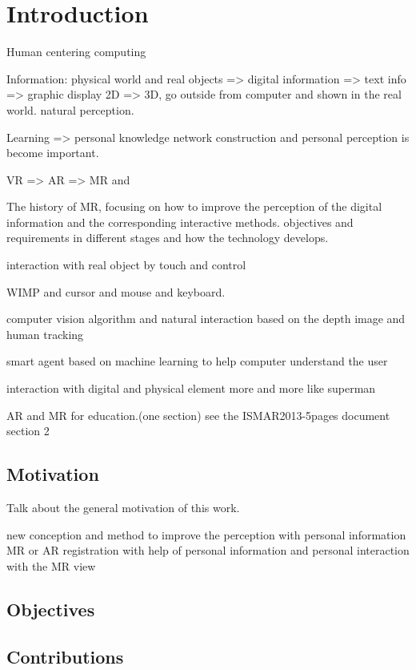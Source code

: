 %

\chapter{Introduction}  %
\label{sec:introduction}

Human centering computing 

Information: physical world and real objects => digital information => text info => graphic display 
2D => 3D, go outside from computer and shown in the real world. natural perception.

Learning => personal knowledge network construction and personal perception is become important.

VR => AR => MR and 

The history of MR, focusing on how to improve the perception of the digital information and the corresponding interactive methods. objectives and requirements in different stages and how the technology develops.

interaction with real object by touch and control 

WIMP and cursor and mouse  and keyboard. 

computer vision algorithm and natural interaction based on the depth image and human tracking

smart agent based on machine learning to help computer understand the user

interaction with digital and physical element more and more like superman 

AR and MR for education.(one section)
see the ISMAR2013-5pages document section 2


\section{Motivation}
Talk about the general motivation of this work.

new conception and method to improve the perception with personal information 
MR or AR registration with help of personal information and personal interaction with the MR view


\section{Objectives}


\section{Contributions}
